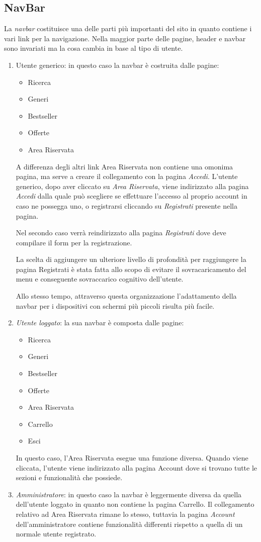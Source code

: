 \subsection{NavBar}
La \textit{navbar} costituisce una delle parti più importanti del sito in quanto contiene i vari link per la navigazione. Nella maggior parte delle pagine, header e navbar sono invariati ma la cosa cambia in base al tipo di utente.
	\begin{enumerate}
		\item Utente generico: in questo caso la navbar è costruita dalle pagine:
			\begin{itemize}
				\item Ricerca
				\item Generi
				\item Bestseller
				\item Offerte
				\item Area Riservata
			\end{itemize}
		A differenza degli altri link Area Riservata non contiene una omonima pagina, ma serve a creare il collegamento con la pagina \textit{Accedi}. L’utente generico, dopo aver cliccato su \textit{Area Riservata}, viene indirizzato alla pagina \textit{Accedi} dalla quale può scegliere se effettuare l’accesso al proprio account in caso ne possegga uno, o registrarsi cliccando su \textit{Registrati} presente nella pagina.
		
		Nel secondo caso verrà reindirizzato alla pagina \textit{Registrati} dove deve compilare il form per la registrazione.
		
		La scelta di aggiungere un ulteriore livello di profondità per raggiungere la pagina Registrati è stata fatta allo scopo di evitare il sovracaricamento del menu e conseguente sovraccarico cognitivo dell’utente.

		Allo stesso tempo, attraverso questa organizzazione l'adattamento della navbar per i dispositivi con schermi più piccoli risulta più facile.

		\item \textit{Utente loggato}: la sua navbar è composta dalle pagine:
			\begin{itemize}
				\item Ricerca
				\item Generi
				\item Bestseller
				\item Offerte
				\item Area Riservata
				\item Carrello
				\item Esci
			\end{itemize}
			In questo caso, l’Area Riservata esegue una funzione diversa. Quando viene cliccata, l’utente viene indirizzato alla pagina Account dove si trovano tutte le sezioni e funzionalità che possiede.		
		\item \textit{Amministratore}: in questo caso la navbar è leggermente diversa da quella dell'utente loggato in quanto non contiene la pagina Carrello. Il collegamento relativo ad Area Riservata rimane lo stesso, tuttavia la pagina \textit{Account} dell’amministratore contiene funzionalità differenti rispetto a quella di un normale utente registrato.	
	\end{enumerate}
